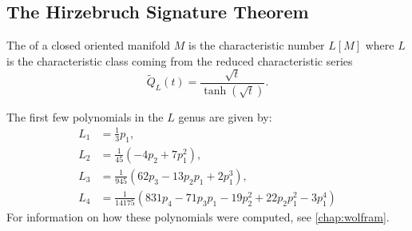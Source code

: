 %
%
\begin{proposition}

\end{proposition}

\subsection{The Hirzebruch Signature Theorem}

\begin{definition}
	The  of a closed oriented manifold $M$ is the characteristic number $L[M]$ where $L$ is the characteristic class coming from the reduced characteristic series
	\[
		\widetilde{Q}_{L}(t) = \frac{\sqrt{t}}{\tanh(\sqrt{t})}.
	\]
\end{definition}

\begin{example}\label{example:L-genus}
	The first few polynomials in the $L$ genus are given by:
\[
	\begin{aligned}
		L_1 &= \frac{1}{3}p_1,\\
		L_2 &= \frac{1}{45}(-4p_2 + 7p_1^2),\\
		L_3 &= \frac{1}{945}(62p_3-13p_2p_1+2p_1^3),\\
		L_4 &= \frac{1}{14175}(831p_4-71p_3p_1-19p_2^2 + 22p_2p_1^2 - 3p_1^4)
	\end{aligned}
\]
	For information on how these polynomials were computed, see \cref{chap:wolfram}.
\end{example}

